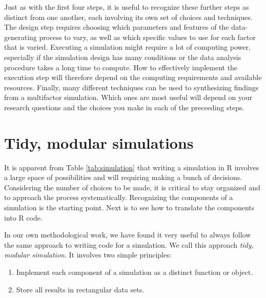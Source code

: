 \documentclass[
]{book}
\providecommand{\tightlist}{%
  \setlength{\itemsep}{0pt}\setlength{\parskip}{0pt}}
\begin{document}
Just as with the first four steps, it is useful to recognize these further steps as distinct from one another, each involving its own set of choices and techniques.
The design step requires choosing which parameters and features of the data-generating process to vary, as well as which specific values to use for each factor that is varied.
Executing a simulation might require a lot of computing power, especially if the simulation design has many conditions or the data analysis procedure takes a long time to compute.
How to effectively implement the execution step will therefore depend on the computing requirements and available resources.
Finally, many different techniques can be used to synthesizing findings from a multifactor simulation.
Which ones are most useful will depend on your research questions and the choices you make in each of the preceeding steps.

\section{Tidy, modular simulations}\label{tidy-modular-simulations}

It is apparent from Table \ref{tab:simulation} that writing a simulation in R involves a large space of possibilities and will requiring making a bunch of decisions.
Considering the number of choices to be made, it is critical to stay organized and to approach the process systematically.
Recognizing the components of a simulation is the starting point.
Next is to see how to translate the components into R code.

In our own methodological work, we have found it very useful to always follow the same approach to writing code for a simulation.
We call this approach \emph{tidy, modular simulation}. It involves two simple principles:

\begin{enumerate}
\def\labelenumi{\arabic{enumi}.}
\tightlist
\item
  Implement each component of a simulation as a distinct function or object.
\item
  Store all results in rectangular data sets.
\end{enumerate}
\end{document}
